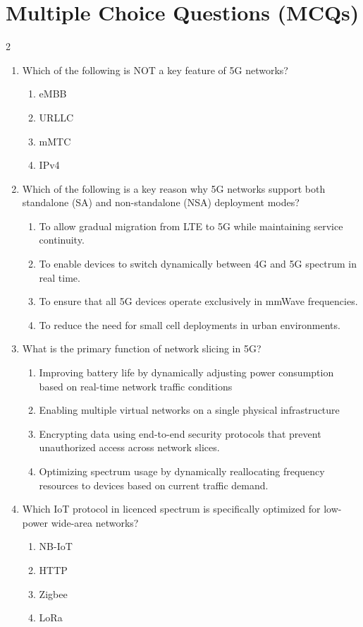 \newpage
\section{Multiple Choice Questions (MCQs)}
\begin{multicols}{2}
\begin{enumerate}
    \item Which of the following is NOT a key feature of 5G networks?
    \begin{enumerate}
        \item eMBB
        \item URLLC
        \item mMTC
        \item IPv4
    \end{enumerate}
    
    \item Which of the following is a key reason why 5G networks support both standalone (SA) and non-standalone (NSA) deployment modes?
    \begin{enumerate}
        \item To allow gradual migration from LTE to 5G while maintaining service continuity.
        \item To enable devices to switch dynamically between 4G and 5G spectrum in real time.
        \item To ensure that all 5G devices operate exclusively in mmWave frequencies.
        \item To reduce the need for small cell deployments in urban environments.
    \end{enumerate}

    \item What is the primary function of network slicing in 5G?
    \begin{enumerate}
        \item Improving battery life by dynamically adjusting power consumption based on real-time network traffic conditions
        \item Enabling multiple virtual networks on a single physical infrastructure
        \item Encrypting data using end-to-end security protocols that prevent unauthorized access across network slices.
        \item Optimizing spectrum usage by dynamically reallocating frequency resources to devices based on current traffic demand.
    \end{enumerate}

    \item Which IoT protocol in licenced spectrum is specifically optimized for low-power wide-area networks?
    \begin{enumerate}
        \item NB-IoT
        \item HTTP
        \item Zigbee
        \item LoRa
    \end{enumerate}


\end{enumerate}
\end{multicols}
